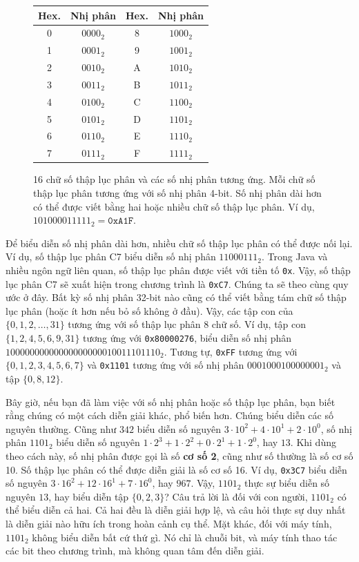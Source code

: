 \begin{figure}[ht]
\centering
\begin{tabular}{cc|cc}
\toprule
\textbf{Hex.} & \textbf{Nhị phân} & \textbf{Hex.} & \textbf{Nhị phân} \\
\midrule
0 & $0000_2$ & 8 & $1000_2$ \\
1 & $0001_2$ & 9 & $1001_2$ \\
2 & $0010_2$ & A & $1010_2$ \\
3 & $0011_2$ & B & $1011_2$ \\
4 & $0100_2$ & C & $1100_2$ \\
5 & $0101_2$ & D & $1101_2$ \\
6 & $0110_2$ & E & $1110_2$ \\
7 & $0111_2$ & F & $1111_2$ \\
\bottomrule
\end{tabular}
\caption{16 chữ số thập lục phân và các số nhị phân tương ứng. Mỗi chữ số thập lục phân tương ứng với số nhị phân 4-bit. Số nhị phân dài hơn có thể được viết bằng hai hoặc nhiều chữ số thập lục phân. Ví dụ, $101000011111_2 = \texttt{0xA1F}$.}
\label{fig:4.6}
\end{figure}

Để biểu diễn số nhị phân dài hơn, nhiều chữ số thập lục phân có thể được nối lại. Ví dụ, số thập lục phân C7 biểu diễn số nhị phân $11000111_2$. Trong Java và nhiều ngôn ngữ liên quan, số thập lục phân được viết với tiền tố \texttt{0x}. Vậy, số thập lục phân C7 sẽ xuất hiện trong chương trình là \texttt{0xC7}. Chúng ta sẽ theo cùng quy ước ở đây. Bất kỳ số nhị phân 32-bit nào cũng có thể viết bằng tám chữ số thập lục phân (hoặc ít hơn nếu bỏ số không ở đầu). Vậy, các tập con của $\{0, 1, 2, \ldots, 31\}$ tương ứng với số thập lục phân 8 chữ số. Ví dụ, tập con $\{1, 2, 4, 5, 6, 9, 31\}$ tương ứng với \texttt{0x80000276}, biểu diễn số nhị phân $10000000000000000000010011101110_2$. Tương tự, \texttt{0xFF} tương ứng với $\{0, 1, 2, 3, 4, 5, 6, 7\}$ và \texttt{0x1101} tương ứng với số nhị phân $0001000100000001_2$ và tập $\{0, 8, 12\}$.

Bây giờ, nếu bạn đã làm việc với số nhị phân hoặc số thập lục phân, bạn biết rằng chúng có một cách diễn giải khác, phổ biến hơn. Chúng biểu diễn các số nguyên thường. Cũng như $342$ biểu diễn số nguyên $3 \cdot 10^2 + 4 \cdot 10^1 + 2 \cdot 10^0$, số nhị phân $1101_2$ biểu diễn số nguyên $1 \cdot 2^3 + 1 \cdot 2^2 + 0 \cdot 2^1 + 1 \cdot 2^0$, hay $13$. Khi dùng theo cách này, số nhị phân được gọi là số \textbf{cơ số 2}, cũng như số thường là số cơ số 10. Số thập lục phân có thể được diễn giải là số cơ số 16. Ví dụ, \texttt{0x3C7} biểu diễn số nguyên $3 \cdot 16^2 + 12 \cdot 16^1 + 7 \cdot 16^0$, hay $967$. Vậy, $1101_2$ thực sự biểu diễn số nguyên $13$, hay biểu diễn tập $\{0, 2, 3\}$? Câu trả lời là đối với con người, $1101_2$ có thể biểu diễn cả hai. Cả hai đều là diễn giải hợp lệ, và câu hỏi thực sự duy nhất là diễn giải nào hữu ích trong hoàn cảnh cụ thể. Mặt khác, đối với máy tính, $1101_2$ không biểu diễn bất cứ thứ gì. Nó chỉ là chuỗi bit, và máy tính thao tác các bit theo chương trình, mà không quan tâm đến diễn giải.


